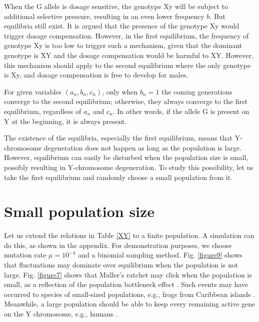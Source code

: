 \documentclass[referee,sn-basic]{sn-jnl}%
\theoremstyle{thmstyleone}%
\theoremstyle{thmstyletwo}%
\theoremstyle{thmstylethree}%
\begin{document}
When the G allele is dosage sensitive, the genotype Xy will be subject to additional selective pressure, resulting in an even lower frequency $b$. But equilibria still exist. It is argued \citep{charlesworth1978model} that the presence of the genotype Xy would trigger dosage compensation. However, in the first equilibrium, the frequency of genotype Xy is too low to trigger such a mechanism, given that the dominant genotype is XY and the dosage compensation would be harmful to XY. However, this mechanism should apply to the second equilibrium where the only genotype is Xy, and dosage compensation is free to develop for males.  

For given variables $(a_n,b_n,c_n)$, only when $b_n=1$ the coming generations converge to the second equilibrium; otherwise, they always converge to the first equilibrium, regardless of $a_n$ and $c_n$. In other words, if the allele G is present on Y at the beginning, it is always present. 

The existence of the equilibria, especially the first equilibrium, means that Y-chromosome degeneration does not happen as long as the population is large. However, equilibrium can easily be disturbed when the population size is small, possibly resulting in Y-chromosome degeneration. To study this possibility, let us take the first equilibrium and randomly choose a small population from it.

\section{Small population size}
Let us extend the relations in Table \ref{XY} to a finite population. A simulation can do this, as shown in the appendix. For demonstration purposes, we choose mutation rate $\mu=10^{-4}$ and a binomial sampling method. Fig. \ref{figure9} shows that fluctuations may dominate over equilibrium when the population is not large. Fig. \ref{figure7} shows that Muller's ratchet may click when the population is small, as a reflection of the population bottleneck effect \citep{Weaver2021}. Such events may have occurred to species of small-sized populations, e.g., frogs from Caribbean islands \citep{Ma2021}. Meanwhile, a large population should be able to keep every remaining active gene on the Y chromosome, e.g., humans \citep{tomaszkiewicz2016time}.
\end{document}
